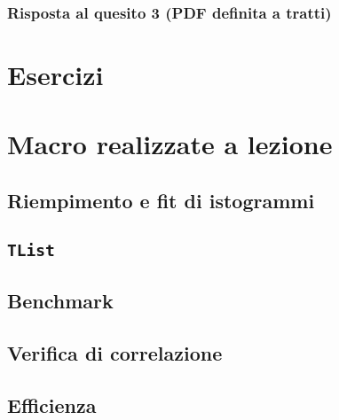 \documentclass{article}
\begin{document}
\subsubsection{Risposta al quesito 3 (PDF definita a tratti)}


\section{Esercizi}









\section{Macro realizzate a lezione}

\subsection{Riempimento e fit di istogrammi}


\subsection{\texttt{TList}}


\subsection{Benchmark}


\subsection{Verifica di correlazione}


\subsection{Efficienza}

\end{document}
